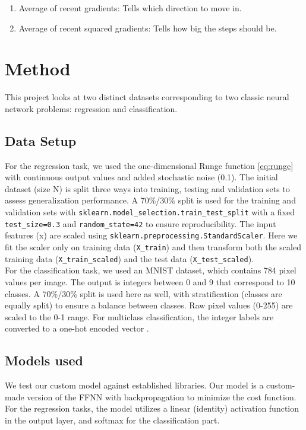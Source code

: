 \documentclass[amssymb,twocolumn,aps,floatfix]{revtex4-2}
\begin{document}
\begin{enumerate}
    \item Average of recent gradients: Tells which direction to move in. 
    \item Average of recent squared gradients: Tells how big the steps should be. 
\end{enumerate}

\section{Method}

This project looks at two distinct datasets corresponding to two classic neural network problems: regression and classification. 

\subsection{Data Setup}
For the regression task, we used the one-dimensional Runge function \ref{eq:runge} with continuous output values and added stochastic noise (0.1). The initial dataset (size N) is split three ways into training, testing and validation sets to assess generalization performance. A 70\%/30\% split is used for the training and validation sets with \texttt{sklearn.model\_selection.train\_test\_split} with a fixed \texttt{test\_size=0.3} and \texttt{random\_state=42} to ensure reproducibility. The input features (x) are scaled using \texttt{sklearn.preprocessing.StandardScaler}. Here we fit the scaler only on training data (\texttt{X\_train}) and then transform both the scaled training data (\texttt{X\_train\_scaled}) and the test data (\texttt{X\_test\_scaled}). \\

For the classification task, we used an MNIST dataset, which contains 784 pixel values per image. The output is integers between 0 and 9 that correspond to 10 classes. A 70\%/30\% split is used here as well, with stratification (classes are equally split) to ensure a balance between classes. Raw pixel values (0-255) are scaled to the 0-1 range.  For multiclass classification, the integer labels are converted to a one-hot encoded vector \cite{hjorthjensen_week42_misc}. \\

\subsection{Models used}

We test our custom model against established libraries. Our model is a custom-made version of the FFNN with backpropagation to minimize the cost function. For the regression tasks, the model utilizes a linear (identity) activation function in the output layer, and softmax for the classification part. 
\end{document}
